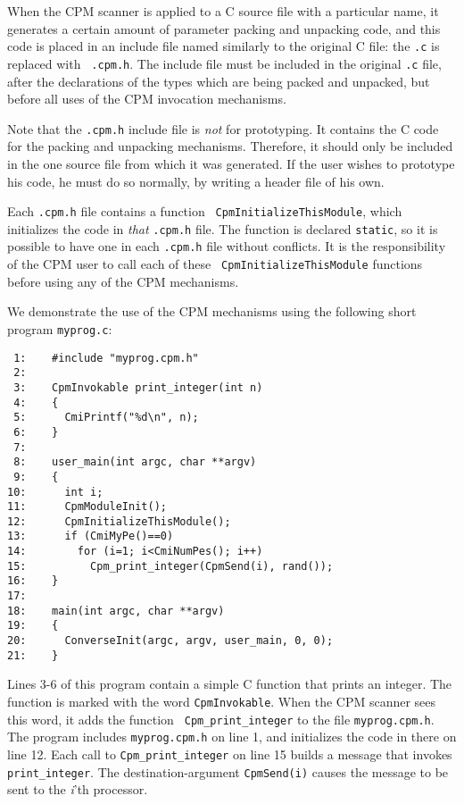 When the CPM scanner is applied to a C source file with a particular
name, it generates a certain amount of parameter packing and unpacking
code, and this code is placed in an include file named
similarly to the original C file: the {\tt .c} is replaced with {\tt
.cpm.h}.  The include file must be included in the original {\tt .c}
file, after the declarations of the types which are being packed and
unpacked, but before all uses of the CPM invocation mechanisms.

Note that the {\tt .cpm.h} include file is {\em not} for prototyping.
It contains the C code for the packing and unpacking mechanisms.
Therefore, it should only be included in the one source file from
which it was generated.  If the user wishes to prototype his code, he
must do so normally, by writing a header file of his own.

Each {\tt .cpm.h} file contains a function {\tt
CpmInitializeThisModule}, which initializes the code in {\it that}
{\tt .cpm.h} file.  The function is declared {\tt static}, so it is
possible to have one in each {\tt .cpm.h} file without conflicts.  It
is the responsibility of the CPM user to call each of these {\tt
CpmInitializeThisModule} functions before using any of the CPM
mechanisms.

We demonstrate the use of the CPM mechanisms using the following
short program {\tt myprog.c}:

\begin{verbatim}
 1:    #include "myprog.cpm.h"
 2:   
 3:    CpmInvokable print_integer(int n)
 4:    {
 5:      CmiPrintf("%d\n", n);
 6:    }
 7:    
 8:    user_main(int argc, char **argv)
 9:    {
10:      int i;
11:      CpmModuleInit();
12:      CpmInitializeThisModule();
13:      if (CmiMyPe()==0)
14:        for (i=1; i<CmiNumPes(); i++)
15:          Cpm_print_integer(CpmSend(i), rand());
16:    }
17:    
18:    main(int argc, char **argv)
19:    {
20:      ConverseInit(argc, argv, user_main, 0, 0);
21:    }
\end{verbatim}

Lines 3-6 of this program contain a simple C function that prints an
integer.  The function is marked with the word {\tt CpmInvokable}.
When the CPM scanner sees this word, it adds the function {\tt
Cpm\_print\_integer} to the file {\tt myprog.cpm.h}.  The program
includes {\tt myprog.cpm.h} on line 1, and initializes the code in
there on line 12.  Each call to {\tt Cpm\_print\_integer} on line 15
builds a message that invokes {\tt print\_integer}.  The
destination-argument {\tt CpmSend(i)} causes the message to be sent to
the {\it i}'th processor.

